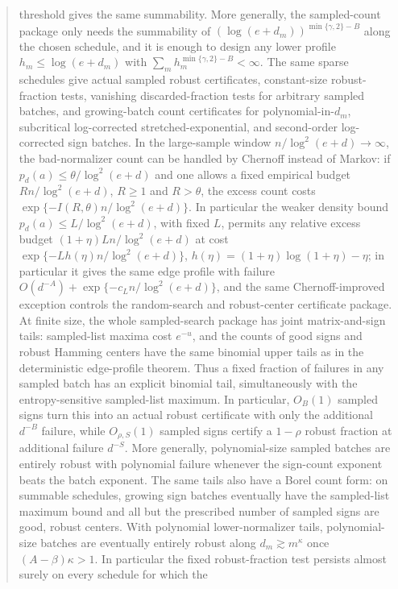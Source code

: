 \documentclass[11pt]{amsart}
\numberwithin{equation}{section}
\theoremstyle{definition}
\theoremstyle{remark}
\begin{document}
\begin{abstract}
threshold gives the same summability.  More generally, the sampled-count package
only needs the summability of
\((\log(e+d_m))^{\min\{\gamma,2\}-B}\) along the chosen schedule, and it is
enough to design any lower profile \(h_m\le\log(e+d_m)\) with
\(\sum_m h_m^{\min\{\gamma,2\}-B}<\infty\).  The same sparse schedules give
actual sampled robust certificates, constant-size
robust-fraction tests, vanishing discarded-fraction tests for arbitrary sampled
batches, and growing-batch count certificates for
polynomial-in-\(d_m\), subcritical log-corrected stretched-exponential, and
second-order log-corrected sign batches.  In the
large-sample window \(n/\log^2(e+d)\to\infty\), the bad-normalizer count can be
handled by Chernoff instead of Markov: if
\(p_d(a)\le \theta/\log^2(e+d)\) and one allows a fixed empirical budget
\(Rn/\log^2(e+d)\), \(R\ge1\) and \(R>\theta\), the excess count costs
\(\exp\{-I(R,\theta)n/\log^2(e+d)\}\).  In particular the weaker density bound
\(p_d(a)\le L/\log^2(e+d)\), with fixed \(L\), permits any relative excess
budget \((1+\eta)Ln/\log^2(e+d)\) at cost
\(\exp\{-Lh(\eta)n/\log^2(e+d)\}\), \(h(\eta)=(1+\eta)\log(1+\eta)-\eta\);
in particular it gives the same edge profile with failure
\(O(d^{-A})+\exp\{-c_L n/\log^2(e+d)\}\), and the same Chernoff-improved
exception controls the random-search and robust-center certificate package.
At finite size, the whole sampled-search package has joint matrix-and-sign
tails: sampled-list maxima cost \(e^{-u}\), and the counts of good signs and
robust Hamming centers have the same binomial upper tails as in the deterministic
edge-profile theorem.  Thus a fixed fraction of failures in any sampled batch
has an explicit binomial tail, simultaneously with the entropy-sensitive
sampled-list maximum.  In particular, \(O_B(1)\) sampled signs turn this into an
actual robust certificate with only the additional \(d^{-B}\) failure, while
\(O_{\rho,S}(1)\) sampled signs certify a \(1-\rho\) robust fraction at
additional failure \(d^{-S}\).  More
generally, polynomial-size sampled batches are entirely robust with polynomial
failure whenever the sign-count exponent beats the batch exponent.  The same
tails also have a Borel count form: on summable schedules, growing sign batches
eventually have the sampled-list maximum bound and all but the prescribed
number of sampled signs are good, robust centers.  With polynomial
lower-normalizer tails, polynomial-size batches are eventually entirely robust
along \(d_m\gtrsim m^\kappa\) once \((A-\beta)\kappa>1\).  In particular the fixed
robust-fraction test persists almost surely on every schedule for which the

\end{abstract}
\end{document}
